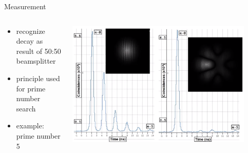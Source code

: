 \documentclass[aspectratio=169,9pt]{beamer}
\begin{document}
\begin{frame}[t]{Measurement}
  \begin{columns}[T]
    \begin{column}{0.4\textwidth}
      \begin{itemize}
        \item recognize decay as result of 50:50 beamsplitter
        \item principle used for prime number search
        \item example: prime number 5
      \end{itemize}
    \end{column}
    \begin{column}{0.6\textwidth}
      \includegraphics[width=0.9\textwidth]{example_measurement.png}
    \end{column}
  \end{columns}
\end{frame}
\end{document}

